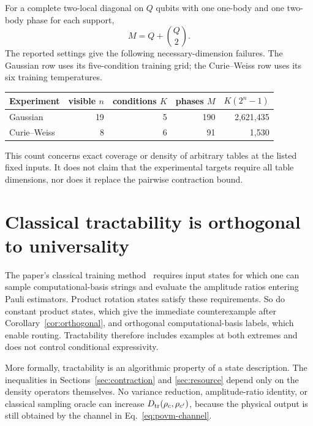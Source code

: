 \documentclass[11pt]{article}
\theoremstyle{definition}
\theoremstyle{remark}
\begin{document}
For a complete two-local diagonal on $Q$ qubits with one one-body and one
two-body phase for each support,
\begin{equation}
 M=Q+\binom{Q}{2}.
 \label{eq:two-local-parameters}
\end{equation}
The reported settings give the following necessary-dimension failures.  The
Gaussian row uses its five-condition training grid; the Curie--Weiss row uses
its six training temperatures.

\begin{center}
\begin{tabular}{lrrrr}
\toprule
Experiment & visible $n$ & conditions $K$ & phases $M$ & $K(2^n-1)$\\
\midrule
Gaussian & 19 & 5 & 190 & 2,621,435\\
Curie--Weiss & 8 & 6 & 91 & 1,530\\
\bottomrule
\end{tabular}
\end{center}

This count concerns exact coverage or density of arbitrary tables at the
listed fixed inputs.  It does not claim that the experimental targets require
all table dimensions, nor does it replace the pairwise contraction bound.

\section{Classical tractability is orthogonal to universality}
\label{sec:ct}

The paper's classical training method~\citep{recioArmengolTrainClassical2025}
requires input states for which one can
sample computational-basis strings and evaluate the amplitude ratios entering
Pauli estimators.  Product rotation states satisfy these requirements.  So do
constant product states, which give the immediate counterexample after
Corollary~\ref{cor:orthogonal}, and orthogonal computational-basis labels,
which enable routing.  Tractability therefore includes examples at both
extremes and does not control conditional expressivity.

More formally, tractability is an algorithmic property of a state
description.  The inequalities in Sections~\ref{sec:contraction} and
\ref{sec:resource} depend only on the density operators themselves.  No
variance reduction, amplitude-ratio identity, or classical sampling oracle
can increase $D_{\rm tr}(\rho_c,\rho_{c'})$, because the physical output is
still obtained by the channel in Eq.~\eqref{eq:povm-channel}.
\end{document}
